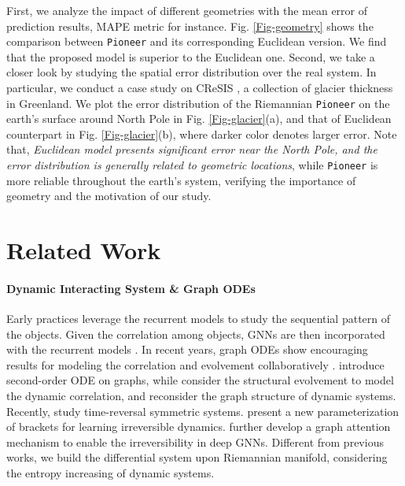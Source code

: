 First, we analyze the impact of different geometries with the mean error of prediction results, MAPE metric for instance.
 Fig. \ref{Fig-geometry} shows the comparison between \texttt{Pioneer} and its corresponding Euclidean version.
 We find that the proposed model is superior to the Euclidean one.
Second, we take a closer look by studying the spatial error distribution over the real system.
In particular, we conduct a case study on CReSIS \citep{MMTIMRF13CgogineniCReSIS}, a collection of glacier thickness in Greenland. 
We plot the error distribution of the Riemannian \texttt{Pioneer} on the earth's surface around North Pole in Fig. \ref{Fig-glacier}(a), and that of Euclidean counterpart in Fig. \ref{Fig-glacier}(b), where darker color denotes larger error.
Note that, 
\emph{Euclidean model presents significant error near the North Pole, 
and the error distribution is generally  related to geometric locations},
while \texttt{Pioneer} is more reliable throughout the earth's system, verifying the importance of geometry and the motivation of our study.







\section{Related Work}

\paragraph{Dynamic Interacting System \& Graph ODEs}
Early practices leverage the recurrent models  to study the sequential pattern of the objects.
Given the correlation among objects, GNNs \cite{nips23ssLRD,www24GAUSS} are then incorporated with the recurrent models \cite{nips19rstgnn,nips19HVGRNN,aaai22Fan}.
In recent years, graph ODEs show encouraging results for modeling the correlation and evolvement collaboratively \cite{kdd21CoupledGraphODE,wsdm23Luo}.
\citet{icml23HOPE,kdd22zhang,PMLR20Xhonneux} introduce second-order ODE on graphs,
 while  \citet{kdd21CoupledGraphODE,wsdm23Luo} consider the structural evolvement to model the dynamic correlation, and
\citet{aaai24ChenWLLsigned} reconsider the graph structure of dynamic systems.
Recently, \citet{nips23tango} study  time-reversal symmetric systems. \citet{nips21Lee} present a new parameterization of brackets for learning irreversible dynamics. \citet{nips23Lee} further develop a  graph attention mechanism  to enable the irreversibility in deep GNNs.
Different from previous works, we build the differential system upon Riemannian manifold, considering the entropy increasing of dynamic systems.


